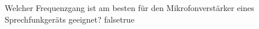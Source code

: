     {Welcher Frequenzgang ist am besten für den Mikrofonverstärker eines Sprechfunkgeräts geeignet?}
    {}
    {}
    {}
    {}
    {false}{true}